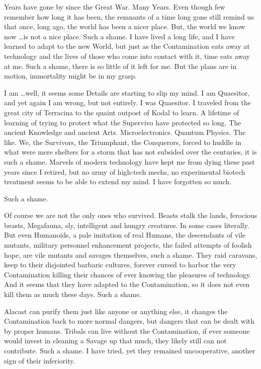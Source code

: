 Years have gone by since the Great War.
Many Years.
Even though few remember how long it has been, the remnants of a time long gone still remind us that once,
long ago, the world has been a nicer place.
But, the world we know now \ldots is not a nice place.
Such a shame.
I have lived a long life, and I have learned to adapt to the new World,
but just as the Contamination eats away at technology and the lives of those who come into contact with it, time
eats away at me.
Such a shame, there is so little of it left for me.
But the plans are in motion, immortality might be in my grasp.\par
I am \ldots well, it seems some Details are starting to slip my mind.
I am Quaesitor, and yet again I am wrong, but not entirely.
I was Quaesitor.
I traveled from the great city of Terracina to the quaint outpost of Kodal to learn.
A lifetime of learning of trying to protect what the Supervivo have protected so long.
The ancient Knowledge and ancient Arts.
Microelectronics.
Quantum Physics.
The like.
We, the Survivors, the Triumphant, the Conquerors,
forced to huddle in what were mere shelters for a storm that has not subsided over the centuries,
it is such a shame.
Marvels of modern technology have kept me from dying these past years since I retired,
but no army of high-tech mechs, no experimental biotech treatment seems to be able to extend my mind.
I have forgotten so much.
\par Such a shame.\par
Of course we are not the only ones who survived.
Beasts stalk the lands, ferocious beasts, Megafauna, sly, intelligent and hungry creatures.
In some cases literally.
But even Humanoids, a pale imitation of real Humans, the descendants of vile mutants,
military personnel enhancement projects, the failed attempts of foolish hope,
are vile mutants and savages themselves, such a shame.
They raid caravans, keep to their disjointed barbaric cultures,
forever cursed to harbor the very Contamination killing their chances of ever knowing the pleasures of technology.
And it seems that they have adapted to the Contamination, so it does not even kill them as much these days.
Such a shame. \par
Alacast can purify them just like anyone or anything else,
it changes the Contamination back to more normal dangers, but dangers that can be dealt with by proper humans.
Tribals can live without the Contamination,
if ever someone would invest in cleaning a Savage up that much, they likely still can not contribute.
Such a shame.
I have tried, yet they remained uncooperative, another sign of their inferiority.
